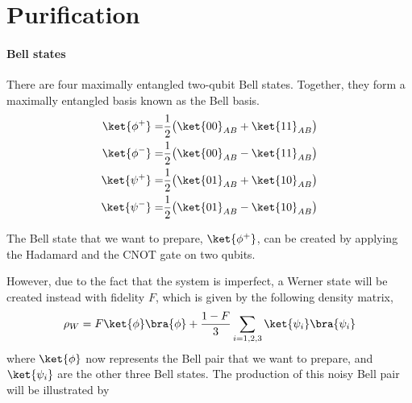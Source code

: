 \chapter{Purification}

\subsubsection*{Bell states}

There are four maximally entangled two-qubit Bell states. Together, they form a maximally entangled basis known as the Bell basis.
\begin{align}\label{bellpairs}
  \ket{\phi^+} =& \frac{1}{2}\big(\ket{00}_{AB} + \ket{11}_{AB}\big) \\
  \ket{\phi^-} =& \frac{1}{2}\big(\ket{00}_{AB} - \ket{11}_{AB}\big) \\
  \ket{\psi^+} =& \frac{1}{2}\big(\ket{01}_{AB} + \ket{10}_{AB}\big) \\
  \ket{\psi^-} =& \frac{1}{2}\big(\ket{01}_{AB} - \ket{10}_{AB}\big)
\end{align}

The Bell state that we want to prepare, $\ket{\phi^+}$, can be created by applying the Hadamard and the CNOT gate on two qubits.

\begin{center}
\end{center}

However, due to the fact that the system is imperfect, a Werner state will be created instead with fidelity $F$, which is given by the following density matrix,
\begin{equation}\label{werner}
  \rho_W = F\ket{\phi}\bra{\phi} + \frac{1-F}{3}\sum_{i=1,2,3}\ket{\psi_i}\bra{\psi_i}
\end{equation}
where $\ket{\phi}$ now represents the Bell pair that we want to prepare, and $\ket{\psi_i}$ are the other three Bell states. The production of this noisy Bell pair will be illustrated by
\begin{center}
\end{center}

